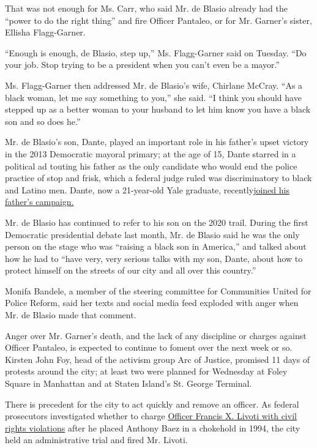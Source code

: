 That was not enough for Ms. Carr, who said Mr. de Blasio already had the
``power to do the right thing'' and fire Officer Pantaleo, or for Mr.
Garner's sister, Ellisha Flagg-Garner.

``Enough is enough, de Blasio, step up,'' Ms. Flagg-Garner said on
Tuesday. ``Do your job. Stop trying to be a president when you can't
even be a mayor.''

Ms. Flagg-Garner then addressed Mr. de Blasio's wife, Chirlane McCray.
``As a black woman, let me say something to you,'' she said. ``I think
you should have stepped up as a better woman to your husband to let him
know you have a black son and so does he.''

Mr. de Blasio's son, Dante, played an important role in his father's
upset victory in the 2013 Democratic mayoral primary; at the age of 15,
Dante starred in a political ad touting his father as the only candidate
who would end the police practice of stop and frisk, which a federal
judge ruled was discriminatory to black and Latino men. Dante, now a
21-year-old Yale graduate,
recently\href{https://www.nytimes3xbfgragh.onion/2019/07/12/nyregion/dante-de-blasio-2020-iowa.html?rref=collection\%2Fbyline\%2Fjeffery-c.-mays\&action=click\&contentCollection=undefined\&region=stream\&module=stream_unit\&version=latest\&contentPlacement=4\&pgtype=collection}{joined
his father's campaign.}

Mr. de Blasio has continued to refer to his son on the 2020 trail.
During the first Democratic presidential debate last month, Mr. de
Blasio said he was the only person on the stage who was ``raising a
black son in America,'' and talked about how he had to ``have very, very
serious talks with my son, Dante, about how to protect himself on the
streets of our city and all over this country.''

Monifa Bandele, a member of the steering committee for Communities
United for Police Reform, said her texts and social media feed exploded
with anger when Mr. de Blasio made that comment.

Anger over Mr. Garner's death, and the lack of any discipline or charges
against Officer Pantaleo, is expected to continue to foment over the
next week or so. Kirsten John Foy, head of the activism group Arc of
Justice, promised 11 days of protests around the city; at least two were
planned for Wednesday at Foley Square in Manhattan and at Staten
Island's St. George Terminal.

There is precedent for the city to act quickly and remove an officer. As
federal prosecutors investigated whether to charge
\href{https://www.nytimes3xbfgragh.onion/1998/10/09/nyregion/former-officer-gets-7-1-2-years-in-man-s-death.html?auth=login-email}{Officer
Francis X. Livoti with civil rights violations} after he placed Anthony
Baez in a chokehold in 1994, the city held an administrative trial and
fired Mr. Livoti.

